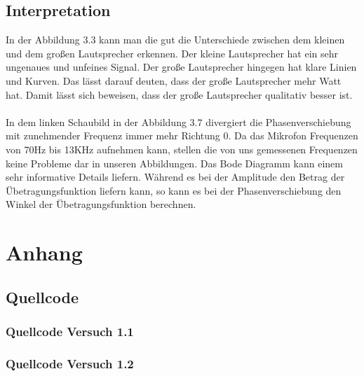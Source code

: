 \documentclass[12pt, oneside, a4paper, \docLanguage]{report}
\begin{document}
\newpage
\section{Interpretation}
\label{chap:VERSUCH_2_INTERPRETATION}
In der Abbildung 3.3 kann man die gut die Unterschiede zwischen dem kleinen und dem großen Lautsprecher erkennen.
Der kleine Lautsprecher hat ein sehr ungenaues und unfeines Signal. 
\newline
Der große Lautsprecher hingegen hat klare Linien und Kurven.
Das lässt darauf deuten, dass der große Lautsprecher mehr Watt hat.
\newline
Damit lässt sich beweisen, dass der große Lautsprecher qualitativ besser ist.
\\~\\
In dem linken Schaubild in der Abbildung 3.7 divergiert die Phasenverschiebung mit zunehmender Frequenz immer mehr Richtung 0.
\newline
Da das Mikrofon Frequenzen von 70Hz bis 13KHz aufnehmen kann, stellen die von uns gemessenen Frequenzen keine Probleme dar in unseren Abbildungen.
Das Bode Diagramm kann einem sehr informative Details liefern.
\newline
Während es bei der Amplitude den Betrag der Übetragungsfunktion liefern kann, so kann es bei der Phasenverschiebung den Winkel der Übetragungsfunktion berechnen.
%
%
\renewcommand\thesection{A.\arabic{section}}
\renewcommand\thesubsection{\thesection.\arabic{subsection}}

\chapter*{Anhang}
\label{chap:APPENDIX}
\addtocounter{chapter}{1}
\setcounter{section}{0}

\section{Quellcode}
\label{chap:APPENDIX_SOURCECODE}

\subsection{Quellcode Versuch 1.1}
\label{chap:APPENDIX_SOURCECODE_V1.1}

\newpage
\subsection{Quellcode Versuch 1.2}
\label{chap:APPENDIX_SOURCECODE_V1.2}

\end{document}
